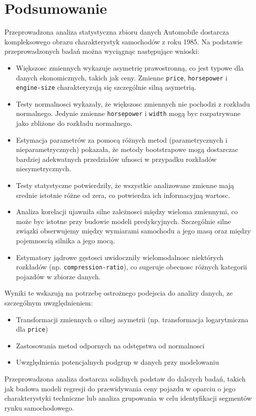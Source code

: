 \documentclass[12pt,a4paper]{article}
\begin{document}
\section{Podsumowanie}

Przeprowadzona analiza statystyczna zbioru danych Automobile dostarcza kompleksowego obrazu charakterystyk samochodów z roku 1985. Na podstawie przeprowadzonych badań można wyciągnąc następujące wnioski:

\begin{itemize}
    \item Większosc zmiennych wykazuje asymetrię prawostronną, co jest typowe dla danych ekonomicznych, takich jak ceny. Zmienne \texttt{price}, \texttt{horsepower} i \texttt{engine-size} charakteryzują się szczególnie silną asymetrią.
    
    \item Testy normalnosci wykazały, że większosc zmiennych nie pochodzi z rozkładu normalnego. Jedynie zmienne \texttt{horsepower} i \texttt{width} mogą byc rozpatrywane jako zbliżone do rozkładu normalnego.
    
    \item Estymacja parametrów za pomocą różnych metod (parametrycznych i nieparametrycznych) pokazała, że metody bootstrapowe mogą dostarczac bardziej adekwatnych przedziałów ufnosci w przypadku rozkładów niesymetrycznych.
    
    \item Testy statystyczne potwierdziły, że wszystkie analizowane zmienne mają srednie istotnie różne od zera, co potwierdza ich informacyjną wartosc.
    
    \item Analiza korelacji ujawniła silne zależnosci między wieloma zmiennymi, co może byc istotne przy budowie modeli predykcyjnych. Szczególnie silne związki obserwujemy między wymiarami samochodu a jego masą oraz między pojemnoscią silnika a jego mocą.
    
    \item Estymatory jądrowe gęstosci uwidoczniły wielomodalnosc niektórych rozkładów (np. \texttt{compression-ratio}), co sugeruje obecnosc różnych kategorii pojazdów w zbiorze danych.
\end{itemize}

Wyniki te wskazują na potrzebę ostrożnego podejscia do analizy danych, ze szczególnym uwzględnieniem:
\begin{itemize}
    \item Transformacji zmiennych o silnej asymetrii (np. transformacja logarytmiczna dla \texttt{price})
    \item Zastosowania metod odpornych na odstępstwa od normalnosci
    \item Uwzględnienia potencjalnych podgrup w danych przy modelowaniu
\end{itemize}

Przeprowadzona analiza dostarcza solidnych podstaw do dalszych badań, takich jak budowa modeli regresji do przewidywania ceny pojazdu w oparciu o jego charakterystyki techniczne lub analiza grupowania w celu identyfikacji segmentów rynku samochodowego.
\end{document}
